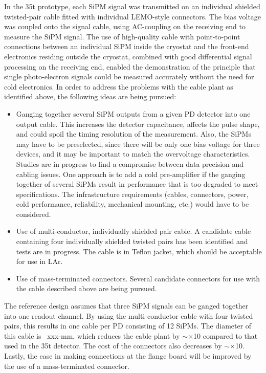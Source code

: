 In the 35t prototype, each SiPM signal was  transmitted on an
individual shielded twisted-pair cable fitted with individual
LEMO-style connectors.  The bias voltage was coupled onto the signal
cable, using AC-coupling on the receiving end to measure the SiPM
signal.  The use of high-quality cable with point-to-point connections
between an individual SiPM inside the cryostat and the front-end
electronics residing outside the cryostat, combined with good
differential signal processing on the receiving end, enabled the
demonstration of the principle that single photo-electron signals
could be measured accurately without the need for cold electronics.
In order to address the problems with the cable plant as identified
above, the following ideas are being pursued:
\begin{itemize}
\item Ganging together several SiPM outputs from a given PD
  detector into one output cable.  This increases the detector
  capacitance, affects the pulse shape, and could spoil the timing
  resolution of the measurement.  Also, the SiPMs may have to be
  preselected, since there will be only one bias voltage for three
  devices, and it may be important to match the overvoltage
  characteristics.  Studies are in progress to find a compromise
  between data precision and cabling issues. One approach is to add a
  cold pre-amplifier if the ganging together of several SiPMs result
  in performance that is too degraded to meet specifications.  The
  infrastructure requirements (cables, connectors, power, cold
  performance, reliability, mechanical mounting, etc.) would have to
  be considered.

\item Use of multi-conductor, individually shielded pair  cable.  A
  candidate cable containing four individually shielded twisted pairs
  has been identified and tests are in progress.  The cable is in
  Teflon jacket, which should be  acceptable for use in LAr.

\item Use of mass-terminated connectors.  Several candidate connectors
  for use with the cable described above are being pursued.
\end{itemize}

The reference design assumes that three SiPM signals  can be ganged
together into one readout channel.  By using the multi-conductor cable
with four twisted pairs, this results in one cable per PD consisting
of 12 SiPMs.  The diameter of this cable is ~xxx-mm,  which reduces the
cable plant by $\sim \times$10 compared to that used in the 35t
detector.  The cost of the connectors also decreases by $\sim \times$10.
Lastly, the ease in making connections at the flange board will be
improved by the use of a mass-terminated connector.

